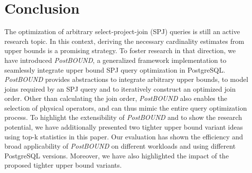 \section{Conclusion}
\label{sec:Conclusion}
The optimization of arbitrary select-project-join (SPJ) queries is still an active research topic.
In this context, deriving the necessary cardinality estimates from upper bounds is a promising strategy.
To foster research in that direction, we have introduced \emph{PostBOUND}, a generalized framework implementation to seamlessly integrate upper bound SPJ query optimization in PostgreSQL. 
\emph{PostBOUND} provides abstractions to integrate arbitrary upper bounds, to model joins required by an SPJ query and to iteratively construct an optimized join order. Other than calculating the join order, \emph{PostBOUND} also enables the selection of physical operators, and can thus mimic the entire query optimization process.
To highlight the extensibility of \emph{PostBOUND} and to show the research potential, we have additionally presented two tighter upper bound variant ideas using top-k statistics in this paper.
Our evaluation has shown the efficiency and broad applicability of \emph{PostBOUND} on different workloads and using different PostgreSQL versions. 
Moreover, we have also highlighted the impact of the proposed tighter upper bound variants. 